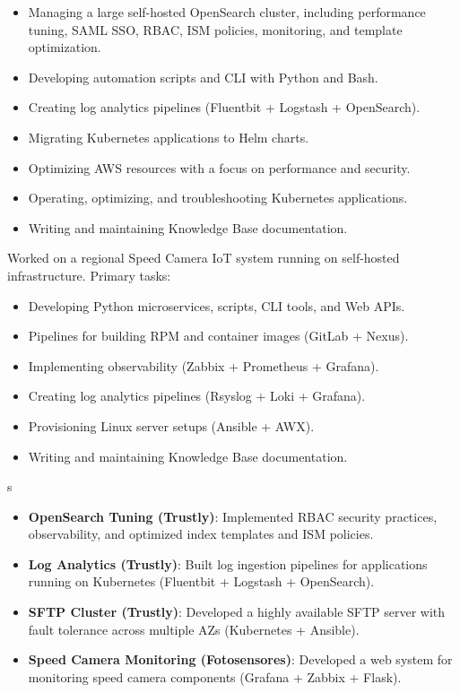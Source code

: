\documentclass[10pt,a4paper]{altacv}
\begin{document}
\begin{itemize}
    \item Managing a large self-hosted OpenSearch cluster, including performance tuning, SAML SSO, RBAC, ISM policies, monitoring, and template optimization.
    \item Developing automation scripts and CLI with Python and Bash.
    \item Creating log analytics pipelines (Fluentbit + Logstash + OpenSearch).
    \item Migrating Kubernetes applications to Helm charts.
    \item Optimizing AWS resources with a focus on performance and security.
    \item Operating, optimizing, and troubleshooting Kubernetes applications.
    \item Writing and maintaining Knowledge Base documentation.
\end{itemize}

\divider


Worked on a regional Speed Camera IoT system running on self-hosted infrastructure. Primary tasks:

\bigskip

\begin{itemize}
    \item Developing Python microservices, scripts, CLI tools, and Web APIs.
    \item Pipelines for building RPM and container images (GitLab + Nexus).  
    \item Implementing observability (Zabbix + Prometheus + Grafana).  
    \item Creating log analytics pipelines (Rsyslog + Loki + Grafana).  
    \item Provisioning Linux server setups (Ansible + AWX).  
    \item Writing and maintaining Knowledge Base documentation.  
\end{itemize}

\bigskip
\bigskip
s

\begin{itemize}
    \item \textbf{OpenSearch Tuning (Trustly)}: Implemented RBAC security practices, observability, and optimized index templates and ISM policies.
    \item \textbf{Log Analytics (Trustly)}: Built log ingestion pipelines for applications running on Kubernetes (Fluentbit + Logstash + OpenSearch).
    \item \textbf{SFTP Cluster (Trustly)}: Developed a highly available SFTP server with fault tolerance across multiple AZs (Kubernetes + Ansible).
    \item \textbf{Speed Camera Monitoring (Fotosensores)}: Developed a web system for monitoring speed camera components (Grafana + Zabbix + Flask).
\end{itemize}


\clearpage
\end{document}
